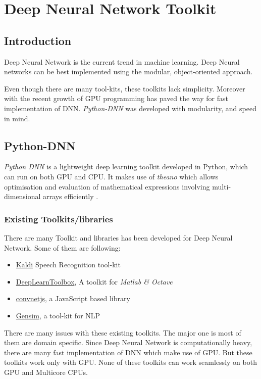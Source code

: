 \chapter{Deep Neural Network Toolkit} 
\label{chap:toolkit}
\section{Introduction}
Deep Neural Network is the current trend
in machine learning. Deep Neural networks can be best implemented using the modular, object-oriented approach. 

Even though there are many tool-kits, these toolkits lack simplicity. Moreover with the recent growth of GPU programming has paved the way for fast implementation of DNN. \textit{Python-DNN} was developed with modularity, and speed in mind.

\section{Python-DNN}
\textit{Python DNN} is a lightweight deep learning toolkit developed in Python, which can run on both GPU and CPU. It makes use of \emph{theano} which allows optimisation and evaluation of mathematical expressions involving multi-dimensional arrays efficiently \cite{bergstra2010theano}.

\subsection{Existing Toolkits/libraries}
There are many Toolkit and libraries has been developed for Deep Neural Network. Some of them are following: 
\begin{itemize}
\item \href{http://kaldi.sourceforge.net/}{Kaldi} Speech Recognition tool-kit
\item \href{https://github.com/rasmusbergpalm/DeepLearnToolbox}{DeepLearnToolbox}, A toolkit for \textit{Matlab \& Octave}
\item \href{http://cs.stanford.edu/people/karpathy/convnetjs/}{convnetjs}, a JavaScript based library
\item \href{https://radimrehurek.com/gensim}{Gensim}, a tool-kit for NLP
\end{itemize}

There are many issues with these existing toolkits. The major one is most of them are domain specific. Since Deep Neural Network is computationally heavy, there are many fast implementation of DNN which make use of GPU. But these toolkits work only with GPU. None of these toolkits can work seamlessly on both GPU and Multicore CPUs. 

